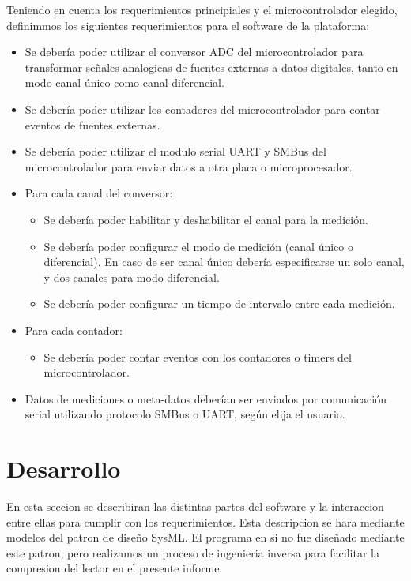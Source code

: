 Teniendo en cuenta los requerimientos principiales y el microcontrolador elegido, definimmos los siguientes requerimientos para el software de la plataforma:

\begin{itemize}
\item Se debería poder utilizar el conversor ADC del microcontrolador para transformar señales analogicas de fuentes externas a datos digitales, tanto en modo canal único como canal diferencial.
\item Se debería poder utilizar los contadores del microcontrolador para contar eventos de fuentes externas.
\item Se debería poder utilizar el modulo serial UART y SMBus del microcontrolador para enviar datos a otra placa o microprocesador.
\item Para cada canal del conversor:
\begin{itemize}
\item Se debería poder habilitar y deshabilitar el canal para la medición.
\item Se debería poder configurar el modo de medición (canal único o diferencial). En caso de ser canal único debería especificarse un solo canal, y dos canales para modo diferencial.
\item Se debería poder configurar un tiempo de intervalo entre cada medición.
\end{itemize}
\item Para cada contador:
\begin{itemize}
\item Se debería poder contar eventos con los contadores o timers del microcontrolador.
\end{itemize}
\item Datos de mediciones o meta-datos deberían ser enviados por comunicación serial utilizando protocolo SMBus o UART, según elija el usuario.

\end{itemize}



\section{Desarrollo} %
\label{it2:sec:desarrollo}

En esta seccion se describiran las distintas partes del software y la interaccion entre ellas para cumplir con los requerimientos. Esta descripcion se hara mediante modelos del patron de diseño SysML. El programa en si no fue diseñado mediante este patron, pero realizamos un proceso de ingenieria inversa para facilitar la compresion del lector en el presente informe.

